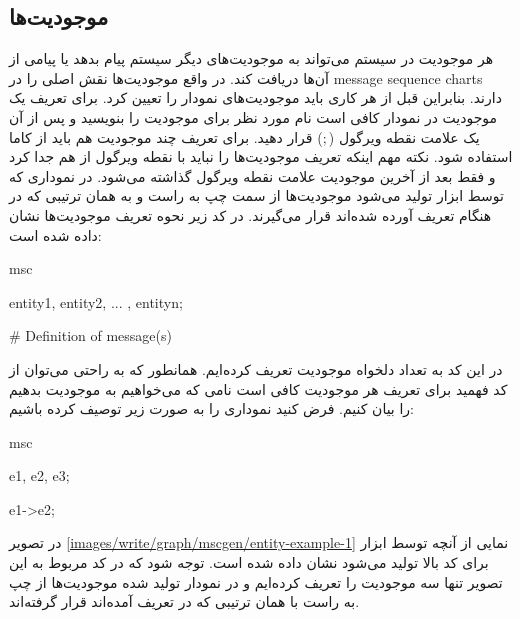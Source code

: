 

\subsection{موجودیت‌ها}


% 
% 

هر موجودیت در سیستم می‌تواند به موجودیت‌های دیگر سیستم پیام بدهد یا پیامی از
آن‌ها دریافت کند. در واقع موجودیت‌ها نقش اصلی را در \glspl{message sequence
chart} دارند. بنابراین قبل از هر کاری باید موجودیت‌های نمودار را تعیین کرد. برای
تعریف یک موجودیت در نمودار کافی است نام مورد نظر برای موجودیت را بنویسید و پس از
آن یک علامت نقطه ویرگول ($;$) قرار دهید. برای تعریف چند موجودیت هم باید از کاما
استفاده شود. نکته مهم اینکه تعریف موجودیت‌ها را نباید با نقطه ویرگول از هم جدا
کرد و فقط بعد از آخرین موجودیت علامت نقطه ویرگول گذاشته می‌شود. در نموداری که
توسط ابزار  تولید می‌شود موجودیت‌ها از سمت چپ به راست و به همان
ترتیبی که در هنگام تعریف آورده شده‌اند قرار می‌گیرند. در کد زیر نحوه تعریف
موجودیت‌ها نشان داده شده است:

\begin{MSC}
msc {
	entity1, entity2, ... ,	entityn;
	
	# Definition of message(s)
	
}
\end{MSC}

در این کد به تعداد دلخواه موجودیت تعریف کرده‌ایم. همانطور که به راحتی می‌توان از
کد فهمید برای تعریف هر موجودیت کافی است نامی که می‌خواهیم به موجودیت بدهیم را
بیان کنیم. فرض کنید نموداری را به صورت زیر توصیف کرده باشیم:

\begin{MSC}
msc {
	e1, e2, e3;
	
	e1->e2;	
}
\end{MSC}

در تصویر \ref{images/write/graph/mscgen/entity-example-1} نمایی از آنچه توسط
ابزار  برای کد بالا تولید می‌شود نشان داده شده است. توجه شود که در کد
مربوط به این تصویر تنها سه موجودیت را تعریف کرده‌ایم و در نمودار تولید شده
موجودیت‌ها از چپ به راست با همان ترتیبی که در تعریف آمده‌اند قرار گرفته‌اند.

